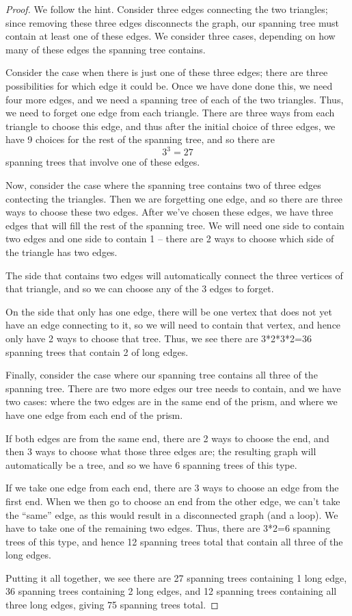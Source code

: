 \documentclass{amsart}
\begin{document}
\begin{proof}

  We follow the hint.  Consider three edges connecting the two triangles; since removing these three edges disconnects the graph, our spanning tree must contain at least one of these edges.  We consider three cases, depending on how many of these edges the spanning tree contains.

  Consider the case when there is just one of these three edges; there are three possibilities for which edge it could be.  Once we have done done this, we need four more edges, and we need a spanning tree of each of the two triangles.  Thus, we need to forget one edge from each triangle.  There are three ways from each triangle to choose this edge, and thus after the initial choice of three edges, we have 9 choices for the rest of the spanning tree, and so there are $$3^3=27$$ spanning trees that involve one of these edges.

  Now, consider the case where the spanning tree contains two of three edges contecting the triangles.  Then we are forgetting one edge, and so there are three ways to choose these two edges.  After we've chosen these edges, we have three edges that will fill the rest of the spanning tree.  We will need one side to contain two edges and one side to contain 1 -- there are 2 ways to choose which side of the triangle has two edges.

  The side that contains two edges will automatically connect the three vertices of that triangle, and so we can choose any of the 3 edges to forget.

  On the side that only has one edge, there will be one vertex that does not yet have an edge connecting to it, so we will need to contain that vertex, and hence only have 2 ways to choose that tree.  Thus, we see there are 3*2*3*2=36 spanning trees that contain 2 of long edges.

  Finally, consider the case where our spanning tree contains all three of the spanning tree.  There are two more edges our tree needs to contain, and we have two cases: where the two edges are in the same end of the prism, and where we have one edge from each end of the prism.

  If both edges are from the same end, there are 2 ways to choose the end, and then 3 ways to choose what those three edges are; the resulting graph will automatically be a tree, and so we have 6 spanning trees of this type.

  If we take one edge from each end, there are 3 ways to choose an edge from the first end.  When we then go to choose an end from the other edge, we can't take the ``same'' edge, as this would result in a disconnected graph (and a loop).  We have to take one of the remaining two edges.  Thus, there are 3*2=6 spanning trees of this type, and hence 12 spanning trees total that contain all three of the long edges.

  Putting it all together, we see there are 27 spanning trees containing 1 long edge, 36 spanning trees containing 2 long edges, and 12 spanning trees containing all three long edges, giving 75 spanning trees total.

  
\end{proof}
\end{document}
